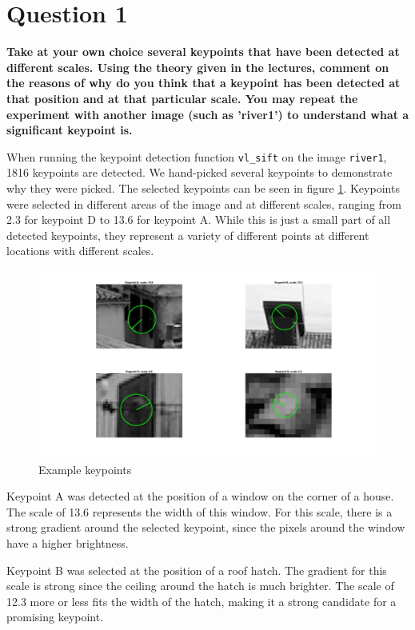 \section{Question 1}

{\bfseries Take at your own choice several keypoints that have been
detected at different scales. Using the theory given in the lectures, comment on
the reasons of why do you think that a keypoint has been detected at that position
and at that particular scale. You may repeat the experiment with another image
(such as 'river1') to understand what a significant keypoint is.}

When running the keypoint detection function \texttt{vl\_sift} on the image \texttt{river1}, 1816 keypoints are detected. We hand-picked several keypoints to demonstrate why they were picked. The selected keypoints can be seen in figure \ref{fig:keypoint01}. Keypoints were selected in different areas of the image and at different scales, ranging from 2.3 for keypoint D to 13.6 for keypoint A. While this is just a small part of all detected keypoints, they represent a variety of different points at different locations with different scales.

\begin{figure}[!hbt]
  \includegraphics[width=\textwidth]{img/keypoint01}
  \caption{Example keypoints}
  \label{fig:keypoint01}
\end{figure}

Keypoint A was detected at the position of a window on the corner of a house. The scale of 13.6 represents the width of this window. For this scale, there is a strong gradient around the selected keypoint, since the pixels around the window have a higher brightness.  

Keypoint B was selected at the position of a roof hatch. The gradient for this scale is strong since the ceiling around the hatch is much brighter. The scale of 12.3 more or less fits the width of the hatch, making it a strong candidate for a promising keypoint.

